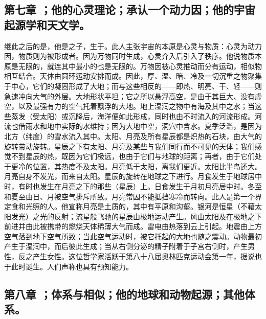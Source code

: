 
\subsection{第七章 ；他的心灵理论；承认一个动力因；他的宇宙起源学和天文学。}

继此之后的是，他是之子，生于。此人主张宇宙的本原是心灵与物质：心灵为动力因，物质则为被形成者。因为万物同时生成，心灵介入后引入了秩序。他说物质本原是无限的，就连其中最小的也是无限的。万物因被心灵推动而分有运动，相似物相互结合。天体由圆环运动安排而成。因此，厚、湿、暗、冷及一切沉重之物聚集于中心，它们的凝固形成了大地；而与这些相反的——即热、明亮、干、轻——则急速冲向大气的外层。大地形状平坦；它之所以悬浮高空，是由于其巨大、没有虚空，以及最强有力的空气托着飘浮的大地。地上湿润之物中有海及其中之水；当这些蒸发（受太阳）或沉降后，海洋便如此形成，同时也由不时流入的河流形成。河流也借雨水和地中实际的水维持；因为大地中空，洞穴中含水。夏季泛滥，是因为北方（纬度）的雪水流入其中。太阳、月亮及所有星辰都是炽热的石块，由大气的旋转带动旋转。星辰之下有太阳、月亮及某些与我们同行而不可见的天体；我们感觉不到星辰的热，既因为它们极远，也由于它们与地球的距离；再者，由于它们处于更冷的位置，其热度不及太阳。月亮低于太阳，离我们更近。太阳比半岛还大。月亮自身不发光，而来自太阳。星辰的旋转在地球之下进行。月食发生于地球居中时，有时也发生在月亮之下的那些（星辰）上。日食发生于月初月亮居中时。冬至和夏至由日、月被空气排斥所致。月亮常因不能抵挡寒冷而转向。此人是第一个界定食和光照的人。他宣称月亮是土质的，其中有平原和沟壑。银河是恒星（不藉太阳发光）之光的反射；流星般飞驰的星辰由极地运动产生。风由太阳及在极地之下前进并由此被携带的燃烧天体稀薄大气而成。雷电由热落到云上引起。地震由上方空气落到地下空气所致；当此空气运动时，被它托起的大地也随之震动。动物最初产生于湿润中，而后彼此生成；当从右侧分泌的精子附着于子宫右侧时，产生男性，反之产生女性。这位哲学家活跃于第八十八届奥林匹克运动会第一年，据说也于此时诞生。人们声称也具有预知能力。\par


\subsection{第八章 ；体系与相似；他的地球和动物起源；其他体系。}

